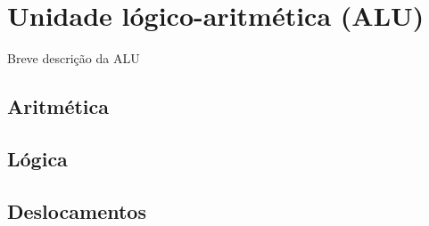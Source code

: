 \documentclass[11pt,a4paper,titlepage,onecolumn]{report}
\begin{document}
	\chapter{Unidade lógico-aritmética (ALU)}
	Breve descrição da ALU
	
	\section{Aritmética}
	
	\section{Lógica}
	
	\section{Deslocamentos}
	
\end{document}
